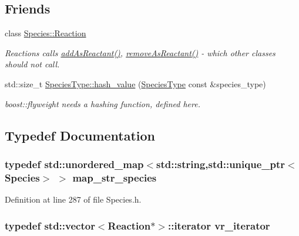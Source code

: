 \subsection*{Friends}
\begin{DoxyCompactItemize}
\item 
class \hyperlink{group__Chemistry_ga5f86463029cca47f8aa15ff8cd5b9e51}{Species\-::\-Reaction}
\begin{DoxyCompactList}\small\item\em Reactions calls \hyperlink{group__Chemistry_ga6fee690741da9669da13f21c300a0874}{add\-As\-Reactant()}, \hyperlink{group__Chemistry_ga9878701daf45bb766200527375a0f6f4}{remove\-As\-Reactant()} -\/ which other classes should not call. \end{DoxyCompactList}\item 
std\-::size\-\_\-t \hyperlink{group__Chemistry_gad48f13e05211225475379004632c68f2}{Species\-Type\-::hash\-\_\-value} (\hyperlink{classSpeciesType}{Species\-Type} const \&species\-\_\-type)
\begin{DoxyCompactList}\small\item\em boost\-::flyweight needs a hashing function, defined here. \end{DoxyCompactList}\end{DoxyCompactItemize}


\subsection{Typedef Documentation}
\hypertarget{group__Chemistry_ga19c0082cabeed7d195eb9a1bc1aca13f}{
\subsubsection[{map\-\_\-str\-\_\-species}]{\setlength{\rightskip}{0pt plus 5cm}typedef std\-::unordered\-\_\-map$<$std\-::string,std\-::unique\-\_\-ptr$<${\bf Species}$>$ $>$ {\bf map\-\_\-str\-\_\-species}}}\label{group__Chemistry_ga19c0082cabeed7d195eb9a1bc1aca13f}


Definition at line 287 of file Species.\-h.

\hypertarget{group__Chemistry_ga3ffcd49efdca1415b74d13f1b9fea3e4}{
\subsubsection[{vr\-\_\-iterator}]{\setlength{\rightskip}{0pt plus 5cm}typedef std\-::vector$<${\bf Reaction}$\ast$$>$\-::iterator {\bf vr\-\_\-iterator}}}\label{group__Chemistry_ga3ffcd49efdca1415b74d13f1b9fea3e4}


